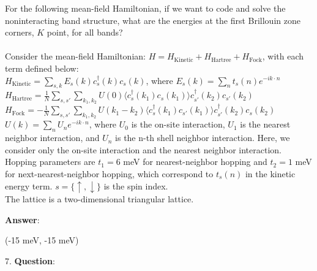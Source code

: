 \documentclass{article}
\begin{document}
   For the following mean-field Hamiltonian, if we want to code and solve the noninteracting band structure, what are the energies at the first Brillouin zone corners, $K$ point, for all bands? \\ \\Consider the mean-field Hamiltonian: $H = H_{\text{Kinetic}} + H_{\text{Hartree}} +H_{\text{Fock}}$, with each term defined below: \\$H_{\text{Kinetic}} = \sum_{s, k} E_s(k) c^\dagger_s(k) c_s(k)$, where $E_s(k)=\sum_{n} t_s(n) e^{-i k \cdot n}$  \\$H_{\text{Hartree}} = \frac{1}{N} \sum_{s, s'} \sum_{k_1, k_2} U(0) \langle c_s^\dagger(k_1) c_s(k_1) \rangle c_{s'}^\dagger(k_2) c_{s'}(k_2)$ \\$H_{\text{Fock}} = -\frac{1}{N} \sum_{s, s'} \sum_{k_1, k_2} U(k_1 - k_2) \langle c_s^\dagger(k_1) c_{s'}(k_1) \rangle c_{s'}^\dagger(k_2) c_s(k_2)$ \\$U(k) = \sum_{n} U_n e^{-i k \cdot n}$, where $U_0$ is the on-site interaction, $U_1$ is the nearest neighbor interaction, and $U_n$ is the n-th shell neighbor interaction. Here, we consider only the on-site interaction and the nearest neighbor interaction. \\Hopping parameters are $t_1 = 6$ meV for nearest-neighbor hopping and $t_2 = 1$ meV for next-nearest-neighbor hopping, which correspond to $t_s(n)$ in the kinetic energy term. $s = \{\uparrow, \downarrow\}$ is the spin index. \\The lattice is a two-dimensional triangular lattice.

   \textbf{Answer}:

   (-15 meV, -15 meV) \\


\clearpage

7. \textbf{Question}:
\end{document}
